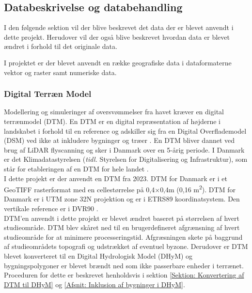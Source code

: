 \subsection{Databeskrivelse og databehandling} \label{Sektion: Databeskrivelse}


I den følgende sektion vil der blive beskrevet det data der er blevet anvendt i dette projekt. Herudover vil der også blive beskrevet hvordan data er blevet ændret i forhold til det originale data.

I projektet er der blevet anvendt en række geografiske data i dataformaterne vektor og raster samt numeriske data. 

\subsubsection{Digital Terræn Model} \label{Afsnit: Digital Terræn Model}
Modellering og simuleringer af oversvømmelser fra havet kræver en digital terrænmodel (DTM). En DTM er en digital repræsentation af højderne i landskabet i forhold til en reference og adskiller sig fra en Digital Overflademodel (DSM) ved ikke at inkludere bygninger og træer \citep{sdfe_dhm_2020}. En DTM bliver dannet ved brug af LiDAR flyscanning og sker i Danmark over en 5-årig periode. 
I Danmark er det Klimadatastyrelsen (\textit{tidl.} Styrelsen for Digitalisering og Infrastruktur), som står for etableringen af en DTM for hele landet \citep{sdfe_dhm_2020}. \\

I dette projekt er der anvendt en DTM fra 2023. DTM for Danmark er i et GeoTIFF rasterformat med en cellestørrelse på 0,4$\times$0,4m (0,16 m\textsuperscript{2}). DTM for Danmark er i UTM zone 32N projektion og er i ETRS89 koordinatsystem. Den vertikale reference er i DVR90 \citep{sdfe_dhm_2020}. \\
DTM'en anvendt i dette projekt er blevet ændret baseret på størrelsen af hvert studieområde. DTM blev skåret ned til en brugerdefineret afgrænsning af hvert studieområde for at minimere processeringstid. Afgræsningen skete på baggrund af studieområdets topografi og udstrækket af eventuel byzone. Derudover er DTM blevet konverteret til en Digital Hydrologisk Model (DHyM) og bygningspolygoner er blevet brændt ned som ikke passerbare enheder i terrænet. Proceduren for dette er beskrevet henholdsvis i sektion \ref{Sektion: Konvertering af DTM til DHyM} og \ref{Afsnit: Inklusion af bygninger i DHyM}.  


